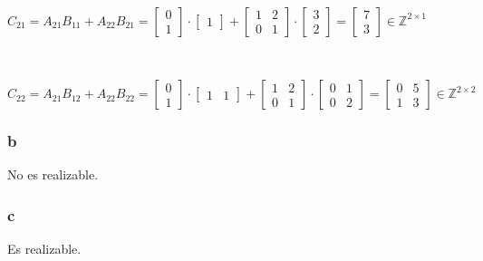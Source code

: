 \documentclass{article}
\begin{document}
\

$C_{21} = A_{21}B_{11} + A_{22}B_{21} =  
\begin{bmatrix}
    0 \\
    1    
\end{bmatrix}
\cdot
\begin{bmatrix}
    1
\end{bmatrix}
+
\begin{bmatrix}
    1 & 2 \\
    0 & 1
\end{bmatrix}
\cdot
\begin{bmatrix}
    3 \\
    2
\end{bmatrix}
=
\begin{bmatrix}
    7 \\
    3
\end{bmatrix} \in \mathbb{Z}^{2\times 1}$

\

$C_{22} = A_{21}B_{12} + A_{22}B_{22} =  
\begin{bmatrix}
    0 \\
    1    
\end{bmatrix}
\cdot
\begin{bmatrix}
    1 & 1
\end{bmatrix}
+
\begin{bmatrix}
    1 & 2 \\
    0 & 1
\end{bmatrix}
\cdot
\begin{bmatrix}
    0 & 1 \\
    0 & 2
\end{bmatrix}
=
\begin{bmatrix}
    0 & 5 \\
    1 & 3
\end{bmatrix} \in \mathbb{Z}^{2\times 2}$

\subsubsection*{b}

No es realizable.

\subsubsection*{c}

Es realizable.

\
\end{document}
